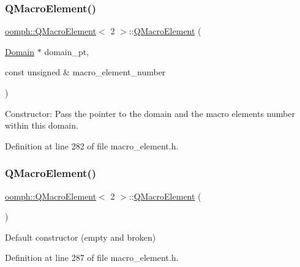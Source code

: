 \subsubsection{\texorpdfstring{Q\+Macro\+Element()}{QMacroElement()}\hspace{0.1cm}{\footnotesize\ttfamily [1/3]}}
{\footnotesize\ttfamily \hyperlink{classoomph_1_1QMacroElement}{oomph\+::\+Q\+Macro\+Element}$<$ 2 $>$\+::\hyperlink{classoomph_1_1QMacroElement}{Q\+Macro\+Element} (\begin{DoxyParamCaption}\item[{\hyperlink{classoomph_1_1Domain}{Domain} $\ast$}]{domain\+\_\+pt,  }\item[{const unsigned \&}]{macro\+\_\+element\+\_\+number }\end{DoxyParamCaption})\hspace{0.3cm}{\ttfamily [inline]}}



Constructor\+: Pass the pointer to the domain and the macro element\textquotesingle{}s number within this domain. 



Definition at line 282 of file macro\+\_\+element.\+h.

\mbox{\label{classoomph_1_1QMacroElement_3_012_01_4_ab709c20b82b4959edfa566b17e1b5441}} 
\subsubsection{\texorpdfstring{Q\+Macro\+Element()}{QMacroElement()}\hspace{0.1cm}{\footnotesize\ttfamily [2/3]}}
{\footnotesize\ttfamily \hyperlink{classoomph_1_1QMacroElement}{oomph\+::\+Q\+Macro\+Element}$<$ 2 $>$\+::\hyperlink{classoomph_1_1QMacroElement}{Q\+Macro\+Element} (\begin{DoxyParamCaption}{ }\end{DoxyParamCaption})\hspace{0.3cm}{\ttfamily [inline]}}



Default constructor (empty and broken) 



Definition at line 287 of file macro\+\_\+element.\+h.


